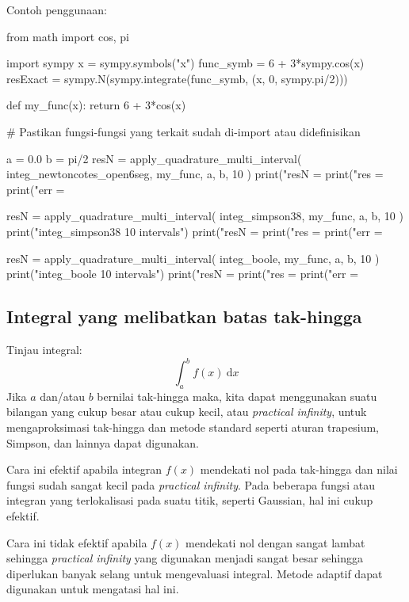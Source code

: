 Contoh penggunaan:
\begin{pythoncode}
from math import cos, pi

import sympy
x = sympy.symbols("x")
func_symb = 6 + 3*sympy.cos(x)
resExact = sympy.N(sympy.integrate(func_symb, (x, 0, sympy.pi/2)))

def my_func(x):
    return 6 + 3*cos(x)

# Pastikan fungsi-fungsi yang terkait sudah di-import atau didefinisikan

a = 0.0
b = pi/2
resN = apply_quadrature_multi_interval(
    integ_newtoncotes_open6seg, my_func, a, b, 10
)
print("resN = %
print("res  = %
print("err  = %

resN = apply_quadrature_multi_interval(
    integ_simpson38, my_func, a, b, 10
)
print("\nUsing integ_simpson38 10 intervals")
print("resN = %
print("res  = %
print("err  = %

resN = apply_quadrature_multi_interval(
    integ_boole, my_func, a, b, 10
)
print("\nUsing integ_boole 10 intervals")
print("resN = %
print("res  = %
print("err  = %
\end{pythoncode}


\subsection{Integral yang melibatkan batas tak-hingga}
Tinjau integral:
\begin{equation}
\int_{a}^{b} f(x)\ \mathrm{d}x
\label{eq:orig_integ}
\end{equation}
Jika $a$ dan/atau $b$ bernilai tak-hingga maka, kita dapat menggunakan suatu bilangan
yang cukup besar atau cukup kecil, atau \textit{practical infinity},
untuk mengaproksimasi tak-hingga dan metode
standard seperti aturan trapesium, Simpson, dan lainnya dapat digunakan.

Cara ini efektif apabila integran $f(x)$ mendekati nol pada tak-hingga dan nilai fungsi
sudah sangat kecil pada \textit{practical infinity}.
Pada beberapa fungsi atau integran yang terlokalisasi pada suatu titik, seperti Gaussian,
hal ini cukup efektif.

Cara ini tidak efektif apabila $f(x)$ mendekati nol dengan sangat lambat sehingga
\textit{practical infinity} yang digunakan menjadi sangat besar sehingga diperlukan
banyak selang untuk mengevaluasi integral. Metode adaptif dapat digunakan untuk
mengatasi hal ini.

